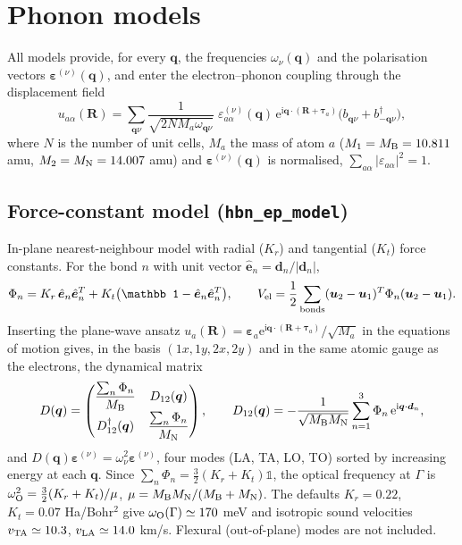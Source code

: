 \documentclass[11pt,a4paper]{article}
\newcommand{\ii}{\mathrm{i}}
\newcommand{\ee}{\mathrm{e}}
\newcommand{\qq}{\bm{q}}
\newcommand{\RR}{\bm{R}}
\newcommand{\dd}{\bm{d}}
\newcommand{\ttau}{\bm{\tau}}
\newcommand{\hate}{\hat{\bm{e}}}
\newcommand{\code}[1]{\texttt{#1}}
\begin{document}
\section{Phonon models}
\label{sec:phonons}

All models provide, for every $\qq$, the frequencies $\omega_\nu(\qq)$ and the polarisation vectors $\bm\varepsilon^{(\nu)}(\qq)$, and enter the electron--phonon coupling through the displacement field
\begin{equation}
u_{a\alpha}(\RR)=\sum_{\qq\nu}\frac{1}{\sqrt{2N M_a\omega_{\qq\nu}}}\;\varepsilon^{(\nu)}_{a\alpha}(\qq)\,\ee^{\ii\qq\cdot(\RR+\ttau_a)}\big(b_{\qq\nu}+b^\dagger_{-\qq\nu}\big),
\label{eq:ufield}
\end{equation}
where $N$ is the number of unit cells, $M_a$ the mass of atom $a$ ($M_1=M_{\rm B}=10.811$ amu, $M_2=M_{\rm N}=14.007$ amu) and $\bm\varepsilon^{(\nu)}(\qq)$ is normalised, $\sum_{a\alpha}|\varepsilon_{a\alpha}|^2=1$.

\subsection{Force-constant model (\code{hbn\_ep\_model})}
In-plane nearest-neighbour model with radial ($K_r$) and tangential ($K_t$) force constants. For the bond $n$ with unit vector $\hate_n=\dd_n/|\dd_n|$,
\begin{equation}
\Phi_n=K_r\,\hate_n\hate_n^{T}+K_t\big(\mathbb 1-\hate_n\hate_n^{T}\big),\qquad
V_{\rm el}=\frac12\sum_{\rm bonds}(\bm u_2-\bm u_1)^T\Phi_n(\bm u_2-\bm u_1).
\end{equation}
Inserting the plane-wave ansatz $u_{a}(\RR)=\bm\varepsilon_a\ee^{\ii\qq\cdot(\RR+\ttau_a)}/\sqrt{M_a}$ in the equations of motion gives, in the basis $(1x,1y,2x,2y)$ and in the same atomic gauge as the electrons, the dynamical matrix
\begin{equation}
D(\qq)=\begin{pmatrix}
\dfrac{\sum_n\Phi_n}{M_{\rm B}} & D_{12}(\qq)\\[2mm]
D_{12}^\dagger(\qq) & \dfrac{\sum_n\Phi_n}{M_{\rm N}}
\end{pmatrix},\qquad
D_{12}(\qq)=-\frac{1}{\sqrt{M_{\rm B}M_{\rm N}}}\sum_{n=1}^{3}\Phi_n\,\ee^{\ii\qq\cdot\dd_n},
\label{eq:Dq}
\end{equation}
and $D(\qq)\bm\varepsilon^{(\nu)}=\omega_\nu^2\bm\varepsilon^{(\nu)}$, four modes (LA, TA, LO, TO) sorted by increasing energy at each $\qq$. Since $\sum_n\Phi_n=\tfrac32(K_r+K_t)\mathbb 1$, the optical frequency at $\Gamma$ is
$\omega_{\rm O}^2=\tfrac32(K_r+K_t)/\mu$, $\mu=M_{\rm B}M_{\rm N}/(M_{\rm B}+M_{\rm N})$. The defaults $K_r=0.22$, $K_t=0.07$ Ha/Bohr$^2$ give $\omega_{\rm O}(\Gamma)\simeq170$ meV and isotropic sound velocities $v_{\rm TA}\simeq10.3$, $v_{\rm LA}\simeq14.0$ km/s. Flexural (out-of-plane) modes are not included.
\end{document}
